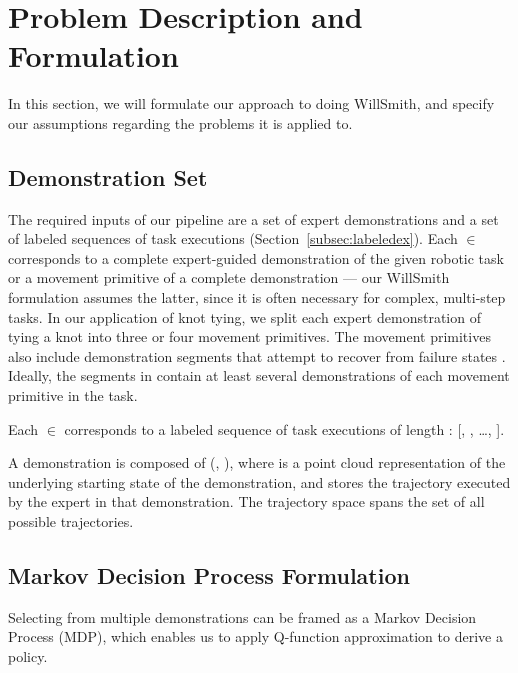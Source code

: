 \section{Problem Description and Formulation}
\label{sec:formulation}
%

In this section, we will formulate our approach to doing WillSmith, and
specify our assumptions regarding the problems it is applied to.

\subsection{Demonstration Set}

The required inputs of our pipeline are a set \demoset{}
of expert demonstrations and a set  of labeled sequences of
task executions (Section~\ref{subsec:labeledex}).
Each \demovar{} $\in$ \demoset{} corresponds to a complete expert-guided
demonstration of the given robotic task or a movement primitive of a complete
demonstration --- our WillSmith formulation assumes the latter,
since it is often necessary for complex, multi-step tasks.
In our application of knot tying, we split each expert demonstration of
tying a knot into three or four movement primitives. The movement primitives
also include demonstration segments that attempt to
recover from failure states \cite{Schulmanetal_ISRR2013}.
Ideally, the segments in \demoset{} contain at least several demonstrations
of each movement primitive in the task.


Each  $\in$  corresponds to a labeled sequence of
task executions of length : [, , \ldots,
]. 

A demonstration \demovar{} is composed of (, ),
where  is a point cloud representation of the underlying
starting state of the demonstration, and  stores
the trajectory executed by the expert in that demonstration. The trajectory
space \trajset{} spans the set of all possible trajectories.


\subsection{Markov Decision Process Formulation}
Selecting from multiple demonstrations can be framed as a Markov Decision
Process (MDP), which enables us to apply Q-function approximation to derive a
policy.

